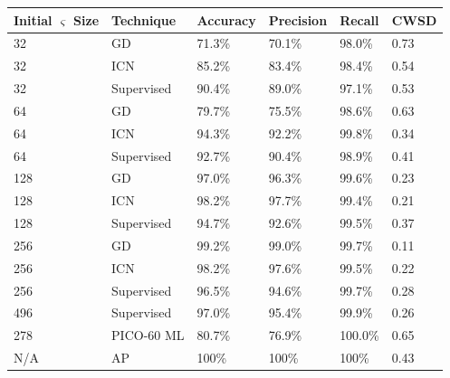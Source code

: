 \documentclass[10pt]{article}
\begin{document}
\begin{minipage}{\textwidth}
    \begin{center}
         \label{semi_success_overview}
        \begin{tabular}{|l|l|l|l|l|l|}
            \hline
            Initial $\varsigma$ Size & Technique & Accuracy & Precision & Recall & CWSD \\
            \hline
            32 & GD & 71.3\% & 70.1\% & 98.0\% & 0.73 \\
            \hline
            32 & ICN & 85.2\% & 83.4\% & 98.4\% & 0.54 \\
            \hline
            32 & Supervised & 90.4\% & 89.0\% & 97.1\% & 0.53 \\
            \hline
            64 & GD & 79.7\% & 75.5\% & 98.6\% & 0.63 \\
            \hline
            64 & ICN & 94.3\% & 92.2\% & 99.8\% & 0.34 \\
            \hline
            64 & Supervised & 92.7\% & 90.4\% & 98.9\% & 0.41 \\
            \hline
            128 & GD & 97.0\% & 96.3\% & 99.6\% & 0.23 \\
            \hline
            128 & ICN & 98.2\% & 97.7\% & 99.4\% & 0.21 \\
            \hline
            128 & Supervised & 94.7\% & 92.6\% & 99.5\% & 0.37 \\
            \hline
            256 & GD & 99.2\% & 99.0\% & 99.7\% & 0.11 \\
            \hline
            256 & ICN & 98.2\% & 97.6\% & 99.5\% & 0.22 \\
            \hline
            256 & Supervised & 96.5\% & 94.6\% & 99.7\% & 0.28 \\
            \hline
            496 & Supervised & 97.0\% & 95.4\% & 99.9\% & 0.26 \\
            \hline
            278 & PICO-60 ML & 80.7\% & 76.9\% & 100.0\% & 0.65 \\
            \hline
            N/A & AP & 100\% & 100\% & 100\% & 0.43 \\
            \hline
        \end{tabular}
    \end{center}
\end{minipage}
\end{document}
